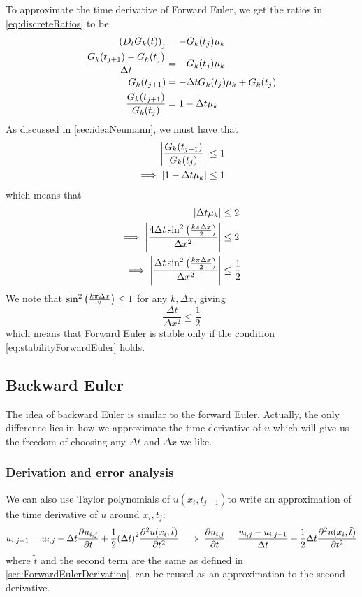 \documentclass[12pt,english,a4paper]{article}
\begin{document}
To approximate the time derivative of Forward Euler, we get the ratios in \ref{eq:discreteRatios} to be
\begin{align*}
\qty(D_tG_k(t))_j &= -G_k(t_j)\mu_k \\
\frac{G_k(t_{j+1}) - G_k(t_j) }{\Delta t} &= -G_k(t_j)\mu_k \\
G_k(t_{j+1}) &= -\Delta t G_k(t_j)\mu_k + G_k(t_j) \\
\frac{G_k(t_{j+1}) }{G_k(t_j)} &= 1-\Delta t \mu_k
\end{align*}
As discussed in \vref{sec:ideaNeumann}, we must have that
\begin{align*}
\abs{\frac{G_k(t_{j+1}) }{G_k(t_j)}} &\leq 1 \\
\implies \abs{1-\Delta t \mu_k} &\leq 1  \\
\end{align*}
which means that
\begin{align*}
\abs{\Delta t \mu_k} &\leq 2\\
\implies \abs{\frac{4 \Delta t \sin^2\qty(\frac{k\pi \Delta x}{2})}{\Delta x^2} } &\leq 2 \\
\implies \abs{\frac{\Delta t \sin^2\qty(\frac{k\pi \Delta x}{2})}{\Delta x^2} } &\leq \frac{1}{2}
\end{align*}
We note that \(\sin^2\qty(\frac{k\pi \Delta x}{2}) \leq 1\) for any \(k,\Delta x\), giving
\begin{equation}\label{eq:stabilityForwardEuler}
\frac{\Delta t}{\Delta x^2} \leq \frac{1}{2}
\end{equation}
which means that Forward Euler is stable only if the condition \vref{eq:stabilityForwardEuler} holds.
%

\subsection{Backward Euler} \label{sec:backwardEuler}
The idea of backward Euler is similar to the forward Euler. Actually, the only difference lies in how we approximate the time derivative of \(u\) which will give us the freedom of choosing any \(\Delta t\) and \(\Delta x\) we like.
\subsubsection{Derivation and error analysis}
We can also use Taylor polynomials of \(u(x_i,t_{j-1})\)to write an approximation of the time derivative of \(u\) around \(x_i,t_j\):
\[
    u_{i,j-1} = u_{i,j} - \Delta t\pdv{u_{i,j}}{t} + \frac{1}{2}\qty(\Delta t)^2\pdv[2]{u(x_i,\tilde{t})}{t}
    \implies \pdv{u_{i,j}}{t} = \frac{u_{i,j}-u_{i,j-1}}{\Delta t} + \frac{1}{2}\Delta t\pdv[2]{u(x_i,\tilde{t})}{t}
\]
where \(\tilde{t}\) and the second term are the same as defined in \vref{sec:ForwardEulerDerivation}.  can be reused as an approximation to the second derivative.
\end{document}
